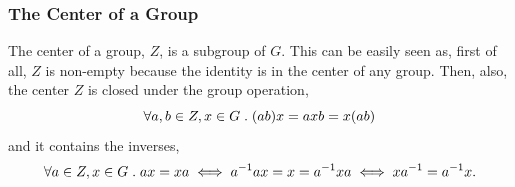 \documentclass[MathsNotesBase.tex]{subfiles}
\begin{document}
{		\bigskip
		\subsubsection{The Center of a Group}
	
		
		The center of a group, $Z$, is a subgroup of $G$. This can be easily seen as, first of all, $Z$ is non-empty because the identity is in the center of any group. Then, also, the center $Z$ is closed under the group operation,
		\[ \forall a,b \in Z, x \in G \;.\; (ab)x = axb = x(ab) \]
		and it contains the inverses,
		\[ \forall a \in Z, x \in G \;.\; ax = xa \iff {a}^{-1}ax = x = {a}^{-1}xa \iff x{a}^{-1} = {a}^{-1}x. \]
		
}
\end{document}
